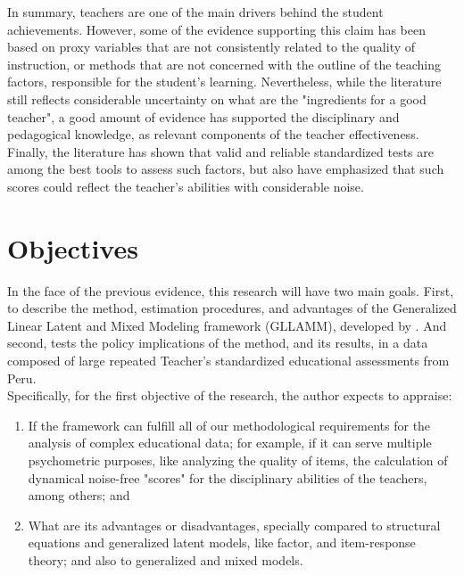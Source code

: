 In summary, teachers are one of the main drivers behind the student achievements. However, some of the evidence supporting this claim has been based on proxy variables that are not consistently related to the quality of instruction, or methods that are not concerned with the outline of the teaching factors, responsible for the student's learning. Nevertheless, while the literature still reflects considerable uncertainty on what are the "ingredients for a good teacher", a good amount of evidence has supported the disciplinary and pedagogical knowledge, as relevant components of the teacher effectiveness. Finally, the literature has shown that valid and reliable standardized tests are among the best tools to assess such factors, but also have emphasized that such scores could reflect the teacher's abilities with considerable noise.

\section{Objectives}

In the face of the previous evidence, this research will have two main goals. First, to describe the method, estimation procedures, and advantages of the Generalized Linear Latent and Mixed Modeling framework (GLLAMM), developed by \citet{Rabe_et_al_2004a, Rabe_et_al_2004b, Skrondal_et_al_2004a, Rabe_et_al_2012}. And second, tests the policy implications of the method, and its results, in a data composed of large repeated Teacher's standardized educational assessments from Peru. \\

\noindent Specifically, for the first objective of the research, the author expects to appraise: 

\begin{enumerate}
	\item If the framework can fulfill all of our methodological requirements for the analysis of complex educational data; for example, if it can serve multiple psychometric purposes, like analyzing the quality of items, the calculation of dynamical noise-free "scores" for the disciplinary abilities of the teachers, among others; and
	
	\item What are its advantages or disadvantages, specially compared to structural equations and generalized latent models, like factor, and item-response theory; and also to generalized and mixed models.
\end{enumerate}

